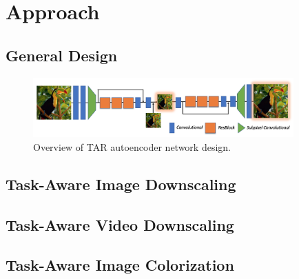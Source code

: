 \newpage
\section{Approach}
\label{sec:Approach}

\subsection{General Design}

\begin{figure}[!htbp]
	\centering
	\includegraphics[width=10cm]{figures/architecture}
	\caption{Overview of TAR autoencoder network design.}
  \label{fig:architecture}
\end{figure}

\subsection{Task-Aware Image Downscaling}

\subsection{Task-Aware Video Downscaling}

\subsection{Task-Aware Image Colorization}


